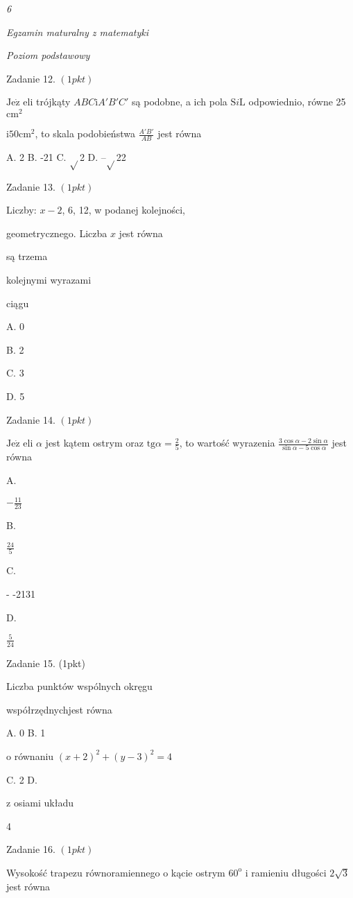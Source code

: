 \documentclass[a4paper,12pt]{article}
\begin{document}
{\it 6}

{\it Egzamin maturalny z matematyki}

{\it Poziom podstawowy}

Zadanie 12. $(1pkt)$

$\mathrm{J}\mathrm{e}\dot{\mathrm{z}}$ eli trójkąty $ABC \mathrm{i} A'B'C'$ są podobne, a ich pola $\mathrm{S}i\mathrm{L}$ odpowiednio, równe 25 $\mathrm{c}\mathrm{m}^{2}$

$\mathrm{i}50\mathrm{c}\mathrm{m}^{2}$, to skala podobieństwa $\displaystyle \frac{A'B'}{AB}$ jest równa

A. 2 B. -21 C. $\sqrt{}$2 D. --$\sqrt{}$22

Zadanie 13. $(1pkt)$

Liczby: $x-2$, 6, 12, w podanej kolejności,

geometrycznego. Liczba $x$ jest równa

są trzema

kolejnymi wyrazami

ciągu

A. 0

B. 2

C. 3

D. 5

Zadanie 14. $(1pkt)$

$\mathrm{J}\mathrm{e}\dot{\mathrm{z}}$ eli $\alpha$ jest kątem ostrym oraz $\displaystyle \mathrm{t}\mathrm{g}\alpha=\frac{2}{5}$, to wartość wyrazenia $\displaystyle \frac{3\cos\alpha-2\sin\alpha}{\sin\alpha-5\cos\alpha}$ jest równa

A.

$-\displaystyle \frac{11}{23}$

B.

$\displaystyle \frac{24}{5}$

C.

- -2131

D.

$\displaystyle \frac{5}{24}$

Zadanie 15. (1pkt)

Liczba punktów wspólnych okręgu

współrzędnychjest równa

A. 0 B. 1

o równaniu $(x+2)^{2}+(y-3)^{2}=4$

C. 2 D.

z osiami układu

4

Zadanie 16. $(1pkt)$

Wysokość trapezu równoramiennego o kącie ostrym $60^{\mathrm{o}}$ i ramieniu długości $2\sqrt{3}$ jest równa
\end{document}
